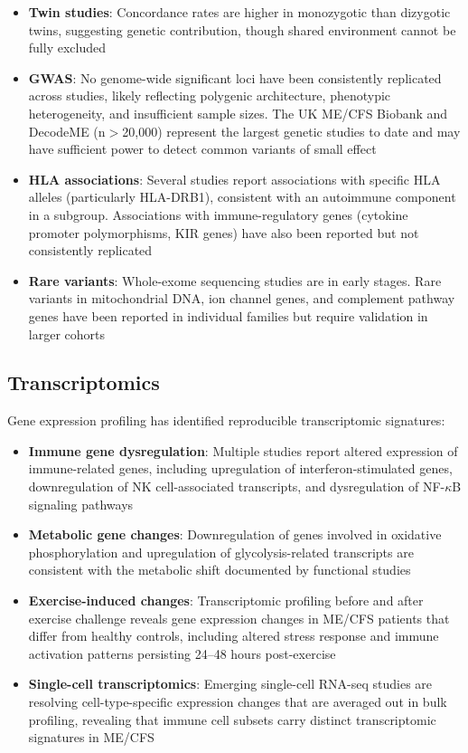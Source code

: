 \begin{itemize}
    \item \textbf{Twin studies}: Concordance rates are higher in monozygotic than dizygotic twins, suggesting genetic contribution, though shared environment cannot be fully excluded
    \item \textbf{GWAS}: No genome-wide significant loci have been consistently replicated across studies, likely reflecting polygenic architecture, phenotypic heterogeneity, and insufficient sample sizes. The UK ME/CFS Biobank and DecodeME (n$>$20,000) represent the largest genetic studies to date and may have sufficient power to detect common variants of small effect
    \item \textbf{HLA associations}: Several studies report associations with specific HLA alleles (particularly HLA-DRB1), consistent with an autoimmune component in a subgroup. Associations with immune-regulatory genes (cytokine promoter polymorphisms, KIR genes) have also been reported but not consistently replicated
    \item \textbf{Rare variants}: Whole-exome sequencing studies are in early stages. Rare variants in mitochondrial DNA, ion channel genes, and complement pathway genes have been reported in individual families but require validation in larger cohorts
\end{itemize}

\subsection{Transcriptomics}

Gene expression profiling has identified reproducible transcriptomic signatures:

\begin{itemize}
    \item \textbf{Immune gene dysregulation}: Multiple studies report altered expression of immune-related genes, including upregulation of interferon-stimulated genes, downregulation of NK cell-associated transcripts, and dysregulation of NF-$\kappa$B signaling pathways
    \item \textbf{Metabolic gene changes}: Downregulation of genes involved in oxidative phosphorylation and upregulation of glycolysis-related transcripts are consistent with the metabolic shift documented by functional studies
    \item \textbf{Exercise-induced changes}: Transcriptomic profiling before and after exercise challenge reveals gene expression changes in ME/CFS patients that differ from healthy controls, including altered stress response and immune activation patterns persisting 24--48 hours post-exercise
    \item \textbf{Single-cell transcriptomics}: Emerging single-cell RNA-seq studies are resolving cell-type-specific expression changes that are averaged out in bulk profiling, revealing that immune cell subsets carry distinct transcriptomic signatures in ME/CFS
\end{itemize}

